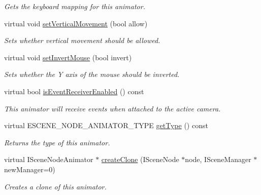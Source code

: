 \begin{DoxyCompactItemize}
\begin{DoxyCompactList}\small\item\em Gets the keyboard mapping for this animator. \end{DoxyCompactList}\item 
\hypertarget{classirr_1_1scene_1_1_c_scene_node_animator_camera_f_p_s_a822eca9e509743de9e27085e1b8fd269}{virtual void \hyperlink{classirr_1_1scene_1_1_c_scene_node_animator_camera_f_p_s_a822eca9e509743de9e27085e1b8fd269}{set\-Vertical\-Movement} (bool allow)}\label{classirr_1_1scene_1_1_c_scene_node_animator_camera_f_p_s_a822eca9e509743de9e27085e1b8fd269}

\begin{DoxyCompactList}\small\item\em Sets whether vertical movement should be allowed. \end{DoxyCompactList}\item 
virtual void \hyperlink{classirr_1_1scene_1_1_c_scene_node_animator_camera_f_p_s_a1fd401f019ab59bc0937c6745a31c525}{set\-Invert\-Mouse} (bool invert)
\begin{DoxyCompactList}\small\item\em Sets whether the Y axis of the mouse should be inverted. \end{DoxyCompactList}\item 
\hypertarget{classirr_1_1scene_1_1_c_scene_node_animator_camera_f_p_s_addf42c2c96e38dfe2ba7ab5242ba534c}{virtual bool \hyperlink{classirr_1_1scene_1_1_c_scene_node_animator_camera_f_p_s_addf42c2c96e38dfe2ba7ab5242ba534c}{is\-Event\-Receiver\-Enabled} () const }\label{classirr_1_1scene_1_1_c_scene_node_animator_camera_f_p_s_addf42c2c96e38dfe2ba7ab5242ba534c}

\begin{DoxyCompactList}\small\item\em This animator will receive events when attached to the active camera. \end{DoxyCompactList}\item 
\hypertarget{classirr_1_1scene_1_1_c_scene_node_animator_camera_f_p_s_aed0f7fa741f48c610178625e507de76d}{virtual E\-S\-C\-E\-N\-E\-\_\-\-N\-O\-D\-E\-\_\-\-A\-N\-I\-M\-A\-T\-O\-R\-\_\-\-T\-Y\-P\-E \hyperlink{classirr_1_1scene_1_1_c_scene_node_animator_camera_f_p_s_aed0f7fa741f48c610178625e507de76d}{get\-Type} () const }\label{classirr_1_1scene_1_1_c_scene_node_animator_camera_f_p_s_aed0f7fa741f48c610178625e507de76d}

\begin{DoxyCompactList}\small\item\em Returns the type of this animator. \end{DoxyCompactList}\item 
virtual I\-Scene\-Node\-Animator $\ast$ \hyperlink{classirr_1_1scene_1_1_c_scene_node_animator_camera_f_p_s_aba6d524d03d5bad7a42716594471199b}{create\-Clone} (I\-Scene\-Node $\ast$node, I\-Scene\-Manager $\ast$new\-Manager=0)
\begin{DoxyCompactList}\small\item\em Creates a clone of this animator. \end{DoxyCompactList}\end{DoxyCompactItemize}


